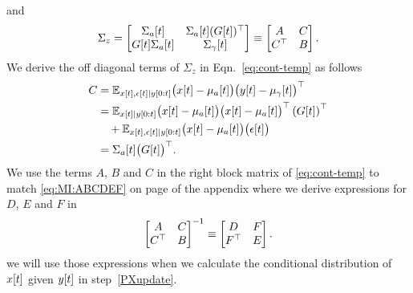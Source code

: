 \begin{enumerate}
\begin{equation*}
  \end{equation*}
  and
  \begin{equation}
    \label{eq:cont-temp}
    \Sigma_z  =
    \begin{bmatrix}
      {\Sigma_a}{[t]} & {\Sigma_a}{[t]} ({G}{[t]})^\top 
      \\ {G}{[t]} {\Sigma_a}{[t]}&{\Sigma_\gamma}{[t]} 
    \end{bmatrix}\equiv
    \begin{bmatrix} A & C \\ C^\top & B \end{bmatrix}.
  \end{equation}
  We derive the off diagonal terms of $\Sigma_z$ in
  Eqn.~\eqref{eq:cont-temp} as follows
  \begin{align}
    C &= \mathbb{E}_{{x}{[t]},{\epsilon}{[t]}\mid y[0:t]}
    \big( {x}{[t]} - {\mu_a}{[t]} \big) \big( {y}{[t]}
      - {\mu_\gamma}{[t]} \big)^\top \nonumber \\
    &=  \mathbb{E}_{{x}{[t]}\mid y[0:t]}
    \big( {x}{[t]} - {\mu_a}{[t]} \big)
    \big( {x}{[t]} - {\mu_a}{[t]} \big)^\top
    \left({G}{[t]} \right)^\top \nonumber \\
    & \quad +
    \mathbb{E}_{{x}{[t]},{\epsilon}{[t]}\mid y[0:t]}
    \big( {x}{[t]} - {\mu_a}{[t]} \big) \big( {\epsilon}{[t]}
    \big) \nonumber \\
    \label{eq:cont:C}
      &= {\Sigma_{a}}{[t]} \big({G}{[t]} \big)^\top .
  \end{align}
  We use the terms $A$, $B$ and $C$ in the right block matrix of
  \eqref{eq:cont-temp} to match \eqref{eq:MI:ABCDEF} on page
  \pageref{eq:MI:ABCDEF} of the appendix where we derive expressions
  for $D$, $E$ and $F$ in 
    \begin{equation*}
      \begin{bmatrix} A & C \\ C^\top & B \end{bmatrix}^{-1} \equiv
      \begin{bmatrix} D & F \\ F^\top & E \end{bmatrix}.
    \end{equation*}
    we will use those expressions when we calculate the conditional
    distribution of ${x}{[t]}$ given ${y}{[t]}$ in
    step~\ref{PXupdate}.


\end{enumerate}
